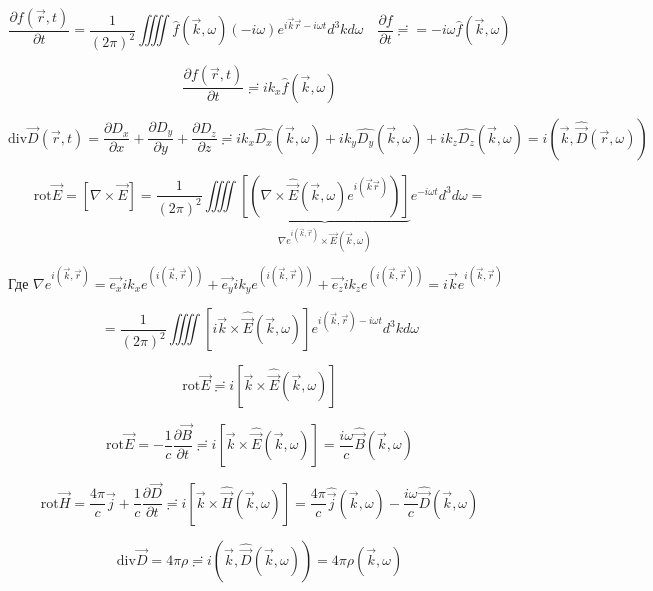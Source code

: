\documentclass[12pt, a4paper]{report}
\begin{document}
\[ \frac{\partial f( \vec{r},t)}{\partial t} = \frac{1}{( 2 \pi ) ^2} \iiiint \hat{f}(\vec{k}, \omega) ( - i \omega) e^{i \vec{k}\vec{r} - i \omega t} d^3 k d \omega \quad \frac{\partial f}{\partial t}  \risingdotseq  = - i \omega \hat{f}( \vec{k}, \omega)    \] 

\[ \frac{\partial f (\vec{r},t)}{\partial t} \risingdotseq i k_x \hat{f}( \vec{k}, \omega) \]

\[ \mathrm{div} \vec{D}(\vec{r},t) = \frac{\partial D_x}{\partial x} + \frac{\partial D_y}{\partial y} + \frac{\partial D_z}{\partial z} \risingdotseq i k_x \hat{D_x}(\vec{k}, \omega) + i k_y \hat{D_y}(\vec{k}, \omega) + i k_z \hat{D_z}(\vec{k}, \omega)  = i (\vec{k},\hat{\vec{D}}(\vec{r}, \omega) ) \] 

\[ \mathrm{rot}\vec{E} = [\nabla \times  \vec{ E} ] = \frac{1}{( 2 \pi ) ^2 } \iiiint \underbrace{\left[ (\nabla \times  \hat{\vec{E}} (\vec{k}, \omega)e^{i (\vec{k}\vec{r}) }   ) \right]}_{\nabla e^{i (\vec{k }, \vec{r })}   \times \vec{E } (\vec{k },\omega) }   e^{- i \omega t } d ^3 d \omega  =      \] 

\begin{center}
    Где \(\nabla e^{i (\vec{k }, \vec{r })} = \vec{e_x }i k_xe^{(i (\vec{k }, \vec{r }))}+ \vec{e_y } i k_y e^{(i (\vec{k }, \vec{r }))} + \vec{e_z } i k_z e^{(i (\vec{k }, \vec{r }))}= i\vec{k } e ^{ i ( \vec{k } , \vec{r})} \)    
\end{center}


\[= \frac{1}{( 2 \pi) ^2 } \iiiint \left[ i \vec{k} \times  \hat{\vec{E }}( \vec{k }, \omega)  \right] e^{i(\vec{k}, \vec{r})- i \omega t} d ^3 k d \omega \] 

\[ \mathrm{rot} \vec{ E }  \risingdotseq i \left[ \vec{k} \times \hat{\vec{E}}(\vec{k}, \omega) \right]   \] 
 
\[ \mathrm{rot} \vec{ E } = - \frac{1}{c} \frac{ \partial \vec{B}}{ \partial t} \risingdotseq i \left[ \vec{k } \times \hat{\vec{E}} ( \vec{k }, \omega)  \right] = \frac{i \omega}{c} \hat{\vec{B } } ( \vec{k }, \omega)     \] 

\[ \mathrm{rot} \vec{H} = \frac{ 4 \pi }{ c} \vec{j } + \frac{1}{ c  }  \frac{ \partial \vec{ D } }{ \partial t } \risingdotseq  i \left[ \vec{k } \times \hat{\vec{H}} ( \vec{k }, \omega) \right] = \frac{  4 \pi }{ c } \hat{\vec{j}} ( \vec{k }, \omega)  - \frac{ i \omega }{c } \hat{ \vec{D} } ( \vec{k }, \omega)        \] 

\[ \mathrm{div} \vec{D } = 4 \pi \rho \risingdotseq i ( \vec{k }, \hat{\vec{D}} ( \vec{k }, \omega) ) = 4 \pi \rho ( \vec{k }, \omega)   \] 
\end{document}
